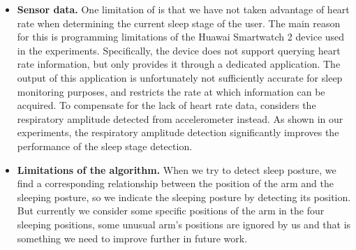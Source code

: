 \begin{itemize}
  \item \textbf{Sensor data.}
  One limitation of {\systemname} is that we have not taken advantage of heart rate when determining the current sleep stage of the user. The main reason for this is programming limitations of the Huawai Smartwatch 2 device used in the experiments. Specifically, the device does not support querying heart rate information, but only provides it through a dedicated application. The output of this application is unfortunately not sufficiently accurate for sleep monitoring purposes, and restricts the rate at which information can be acquired. To compensate for the lack of heart rate data, \systemname considers the respiratory amplitude detected from accelerometer instead. As shown in our experiments, the respiratory amplitude detection significantly improves the performance of the sleep stage detection. %
  \item \textbf{Limitations of the algorithm.}
  When we try to detect sleep posture, we find a corresponding relationship between the position of the arm and the sleeping posture, so we indicate the sleeping posture by detecting its position. But currently we consider some specific positions of the arm in the four sleeping positions, some unusual arm's positions are ignored by us and that is something we need to improve further in future work.
\end{itemize}
